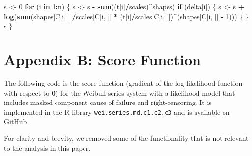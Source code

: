 \documentclass[
]{article}
\newenvironment{Shaded}{\begin{snugshade}}{\end{snugshade}}
\newcommand{\ControlFlowTok}[1]{\textcolor[rgb]{0.13,0.29,0.53}{\textbf{#1}}}
\newcommand{\DecValTok}[1]{\textcolor[rgb]{0.00,0.00,0.81}{#1}}
\newcommand{\KeywordTok}[1]{\textcolor[rgb]{0.13,0.29,0.53}{\textbf{#1}}}
\newcommand{\NormalTok}[1]{#1}
\newcommand{\OperatorTok}[1]{\textcolor[rgb]{0.81,0.36,0.00}{\textbf{#1}}}
\newcommand{\StringTok}[1]{\textcolor[rgb]{0.31,0.60,0.02}{#1}}
\begin{document}
\begin{Shaded}
\begin{Highlighting}[]
\NormalTok{    s \textless{}{-}}\StringTok{ }\DecValTok{0}
    \ControlFlowTok{for}\NormalTok{ (i }\ControlFlowTok{in} \DecValTok{1}\OperatorTok{:}\NormalTok{n) \{}
\NormalTok{        s \textless{}{-}}\StringTok{ }\NormalTok{s }\OperatorTok{{-}}\StringTok{ }\KeywordTok{sum}\NormalTok{((t[i]}\OperatorTok{/}\NormalTok{scales)}\OperatorTok{\^{}}\NormalTok{shapes)}
        \ControlFlowTok{if}\NormalTok{ (delta[i]) \{}
\NormalTok{            s \textless{}{-}}\StringTok{ }\NormalTok{s }\OperatorTok{+}\StringTok{ }\KeywordTok{log}\NormalTok{(}\KeywordTok{sum}\NormalTok{(shapes[C[i, ]]}\OperatorTok{/}\NormalTok{scales[C[i, ]] }\OperatorTok{*}\StringTok{ }\NormalTok{(t[i]}\OperatorTok{/}\NormalTok{scales[C[i,}
\NormalTok{                ]])}\OperatorTok{\^{}}\NormalTok{(shapes[C[i, ]] }\OperatorTok{{-}}\StringTok{ }\DecValTok{1}\NormalTok{)))}
\NormalTok{        \}}
\NormalTok{    \}}
\NormalTok{    s}
\NormalTok{\}}
\end{Highlighting}
\end{Shaded}

\hypertarget{appendix-b-score-function}{%
\section*{Appendix B: Score Function}\label{appendix-b-score-function}}

\label{app:score-code}

The following code is the score function (gradient of the log-likelihood
function with respect to \(\boldsymbol{\theta}\)) for the Weibull series
system with a likelihood model that includes masked component cause of
failure and right-censoring. It is implemented in the R library
\texttt{wei.series.md.c1.c2.c3} and is available on
\href{https://github.com/queelius/wei.series.md.c1.c2.c3}{GitHub}.

For clarity and brevity, we removed some of the functionality that is
not relevant to the analysis in this paper.
\end{document}
